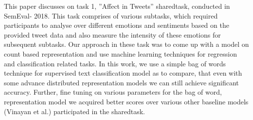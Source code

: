 This paper discusses on task 1, ''Affect in Tweets'' sharedtask, conducted in SemEval- 2018. This task comprises of various subtasks, which required participants to analyse over different emotions and sentiments based on the provided tweet data and also measure the intensity of these emotions for subsequent subtasks. Our approach in these task was to come up with a model on count based representation and use machine learning techniques for regression and classification related tasks. In this work, we use a simple bag of words technique for supervised text classification model as to compare, that even with some advance distributed representation models we can still achieve significant accuracy. Further, fine tuning on various parameters for the bag of word, representation model we acquired better scores over various other baseline models (Vinayan et al.) participated in the sharedtask.
